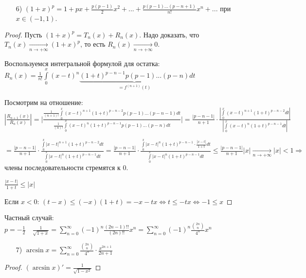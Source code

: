 \begin{enumerate}
    \item[6)] $(1+x)^p=1+px+\frac{p(p-1)}{2}x^2+...+\frac{p(p-1)...(p-n+1)}{n!}x^n+...$ при $x\in (-1, 1)$.
\end{enumerate}

\begin{proof}
    Пусть $(1+x)^p=T_n(x)+R_n(x)$. Надо доказать, что $T_n(x)\underset{n\rightarrow +\infty}{\rightarrow} (1+x)^p$, то есть $R_n(x)\underset{n\rightarrow +\infty}{\rightarrow} 0$.

    Воспользуемся интегральной формулой для остатка: $R_n(x)=\frac{1}{n!}\int\limits_0^x (x-t)^n \underbrace{(1+t)^{p-n-1}p(p-1)...(p-n)}_{=f^{(n+1)}(t)}dt$

    Посмотрим на отношение: $|\frac{R_{n+1}(x)}{R_n(x)}|=\bigg|\frac{\frac{1}{(n+1)!}\int\limits_0^x (x-t)^{n+1} (1+t)^{p-n-2}p(p-1)...(p-n-1)dt}{\frac{1}{(n)!}\int\limits_0^x (x-t)^{n} (1+t)^{p-n-1}p(p-1)...(p-n)dt}\bigg|=\frac{|p-n-1|}{n+1}\cdot \frac{|\int\limits_0^x (x-t)^{n+1}(1+t)^{p-n-2}dt|}{|\int\limits_0^x (x-t)^{n}(1+t)^{p-n-1}dt|}$

    $=\frac{|p-n-1|}{n+1}\cdot \frac{\int\limits_0^x |x-t|^{n+1}(1+t)^{p-n-2}dt}{\int\limits_0^x |x-t|^{n}(1+t)^{p-n-1}dt}=\frac{|p-n-1|}{n+1}\cdot\frac{\int\limits_0^x |x-t|^{n}(1+t)^{p-n-1}\cdot \frac{|x-t|}{1+t}dt}{\int\limits_0^x |x-t|^{n}(1+t)^{p-n-1}dt}\leq \frac{|p-n-1|}{n+1} |x|\underset{n\rightarrow +\infty}{\rightarrow} |x|<1\Rightarrow$ члены последовательности стремятся к 0.

    $\frac{|x-t|}{1+t}\leq |x|$

    Если $x<0$: $(t-x)\leq (-x)(1+ t)=-x-tx\Leftrightarrow t\leq -tx \Leftrightarrow -1\leq x$
\end{proof}

\begin{example}
    Частный случай: $p=-\frac{1}{2}\quad \frac{1}{\sqrt{1+x}}=\sum\limits_{n=0}^\infty (-1)^n\frac{(2n-1)!!}{(2n)!!}x^n=\sum\limits_{n=0}^\infty(-1)^n\frac{\binom{2n}{n}}{4^n}x^n$
\end{example}

\begin{enumerate}
    \item[7)] $\arcsin x=\sum\limits_{n=0}^\infty \frac{\binom{2n}{n}}{4^n}\cdot \frac{x^{2n+1}}{2n+1}$
\end{enumerate}

\begin{proof}
    $(\arcsin x)'=\frac{1}{\sqrt{1-x^2}}$
\end{proof}